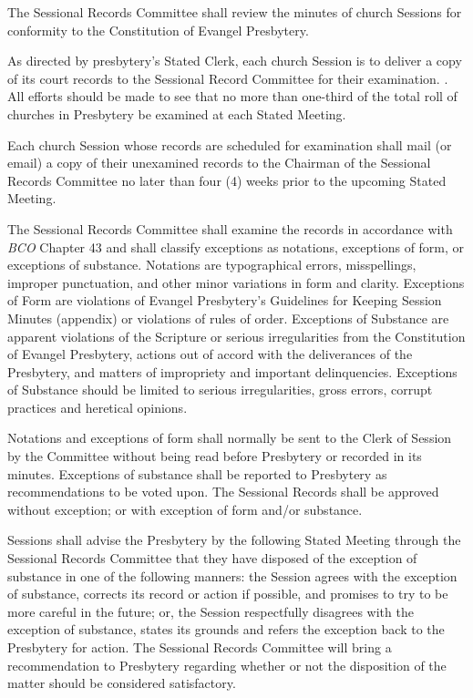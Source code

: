 \documentclass[
]{book}
\begin{document}
\begin{enumerate}
\begin{enumerate}
    The Sessional Records Committee shall review the minutes of church Sessions for conformity to the Constitution of Evangel Presbytery.

    As directed by presbytery's Stated Clerk, each church Session is to deliver a copy of its court records to the Sessional Record Committee for their examination. . All efforts should be made to see that no more than one-third of the total roll of churches in Presbytery be examined at each Stated Meeting.

    Each church Session whose records are scheduled for examination shall mail (or email) a copy of their unexamined records to the Chairman of the Sessional Records Committee no later than four (4) weeks prior to the upcoming Stated Meeting.

    The Sessional Records Committee shall examine the records in accordance with \emph{BCO} Chapter 43 and shall classify exceptions as notations, exceptions of form, or exceptions of substance. Notations are typographical errors, misspellings, improper punctuation, and other minor variations in form and clarity. Exceptions of Form are violations of Evangel Presbytery's Guidelines for Keeping Session Minutes (appendix) or violations of rules of order. Exceptions of Substance are apparent violations of the Scripture or serious irregularities from the Constitution of Evangel Presbytery, actions out of accord with the deliverances of the Presbytery, and matters of impropriety and important delinquencies. Exceptions of Substance should be limited to serious irregularities, gross errors, corrupt practices and heretical opinions.

    Notations and exceptions of form shall normally be sent to the Clerk of Session by the Committee without being read before Presbytery or recorded in its minutes. Exceptions of substance shall be reported to Presbytery as recommendations to be voted upon. The Sessional Records shall be approved without exception; or with exception of form and/or substance.

    Sessions shall advise the Presbytery by the following Stated Meeting through the Sessional Records Committee that they have disposed of the exception of substance in one of the following manners: the Session agrees with the exception of substance, corrects its record or action if possible, and promises to try to be more careful in the future; or, the Session respectfully disagrees with the exception of substance, states its grounds and refers the exception back to the Presbytery for action. The Sessional Records Committee will bring a recommendation to Presbytery regarding whether or not the disposition of the matter should be considered satisfactory.


\end{enumerate}
\end{enumerate}
\end{document}
